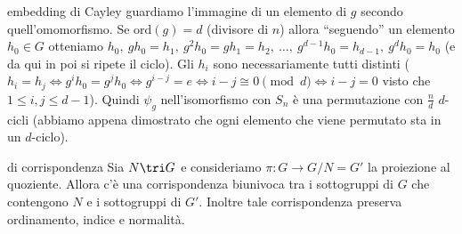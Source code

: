 \begin{observation}{embedding di Cayley}
    guardiamo l'immagine di un elemento di $g$ secondo quell'omomorfismo. Se $\text{ord}(g) = d$ (divisore di $n$) allora ``seguendo'' un elemento $h_0 \in G$ otteniamo $h_0, \ gh_0=h_1, \ g^2h_0 = gh_1=h_2, \ \dots , \ g^{d-1}h_0 = h_{d-1}, \ g^dh_0 = h_0$ (e da qui in poi si ripete il ciclo). Gli $h_i$ sono necessariamente tutti distinti ($h_i = h_j \iff g^ih_0= g^jh_0 \iff g^{i-j} = e \iff i-j \cong 0 \pmod{d} \iff i-j = 0$ visto che $1 \leq i,j\leq d-1$).
    Quindi $\psi_g$ nell'isomorfismo con $S_n$ è una permutazione con $\frac{n}{d}$ $d$-cicli (abbiamo appena dimostrato che ogni elemento che viene permutato sta in un $d$-ciclo).
\end{observation}
\begin{theorem}{di corrispondenza}
    Sia $N \tri G$ e consideriamo $\pi : G \rightarrow G/N = G'$ la proiezione al quoziente. Allora c'è una corrispondenza biunivoca tra i sottogruppi di $G$ che contengono $N$ e i sottogruppi di $G'$. Inoltre tale corrispondenza preserva ordinamento, indice e normalità. 
\end{theorem}
